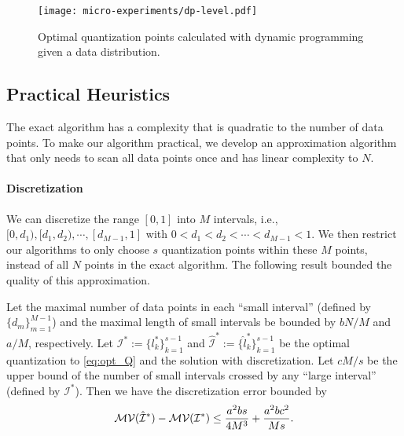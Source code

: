 \begin{figure}[t]
\centering    
\texttt{[image: micro-experiments/dp-level.pdf]} 
\vspace{-1em}
\caption{Optimal quantization points calculated with
dynamic programming given a data distribution. }
\label{fig:optimalquantization}
\end{figure} 


\vspace{-0.5em}
\subsection{Practical Heuristics}
\vspace{-0.5em}

The exact algorithm has a complexity that is quadratic to the number of data points. To make our algorithm practical,
we develop an approximation algorithm that only needs to scan all data points once and has linear complexity to $N$.

\vspace{-0.5em}
\paragraph*{Discretization}

We can discretize the range $[0,1]$ into $M$ intervals, i.e., $[0,d_1), [d_1, d_2), \cdots, [d_{M-1}, 1]$ with $0< d_1<d_2<\cdots < d_{M-1}<1$. We then restrict our algorithms to only choose $s$ quantization points within these $M$ points, instead of all $N$ points in the exact algorithm. The following result bounded the quality of this approximation.

\begin{theorem} \label{thm:optQ}
Let the maximal number of data points in each ``small interval'' (defined by $\{d_m\}_{m=1}^{M-1}$) and the maximal length of small intervals be bounded by $bN/M$ and $a/M$, respectively. Let ${\mathcal{I}^*} := \{l^*_k\}_{k=1}^{s-1}$ and $\hat{\mathcal{I}}^* :=\{\hat{l}^*_k\}_{k=1}^{s-1}$ be the optimal quantization to \eqref{eq:opt_Q} and the solution with discretization. Let $cM/s$ be the upper bound of the number of small intervals crossed by any ``large interval'' (defined by ${\mathcal{I}}^*$). Then we have the discretization error bounded by
\[
 \mathcal{MV}(\hat{\mathcal{I}}^*) -  \mathcal{MV}({\mathcal{I}}^*) \leq {a^2b s \over 4 M^3} + {a^2bc^2 \over Ms}.
\]
\end{theorem}


